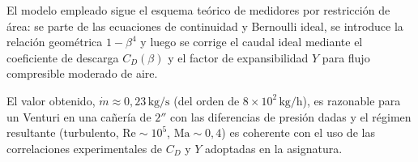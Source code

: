 \documentclass[12pt, a4paper]{article}
\begin{document}
El modelo empleado sigue el esquema teórico de medidores por restricción de área: 
se parte de las ecuaciones de continuidad y Bernoulli ideal, se introduce la relación 
geométrica $1-\beta^4$ y luego se corrige el caudal ideal mediante el coeficiente de 
descarga $C_D(\beta)$ y el factor de expansibilidad $Y$ para flujo compresible moderado
de aire. 

El valor obtenido, $\dot m \approx 0{,}23\,\text{kg/s}$ (del orden de $8\times 10^2\,\text{kg/h}$),
es razonable para un Venturi en una cañería de $2''$ con las diferencias de presión dadas 
y el régimen resultante (turbulento, $\text{Re}\sim 10^5$, $\text{Ma}\sim 0{,}4$) es coherente 
con el uso de las correlaciones experimentales de $C_D$ y $Y$ adoptadas en la asignatura.
\end{document}
